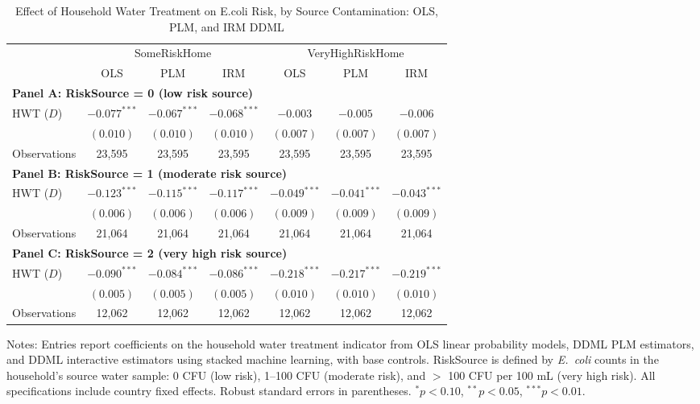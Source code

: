

\begin{table}[htbp]\centering
\caption{Effect of Household Water Treatment on E.coli Risk, by Source Contamination: OLS, PLM, and IRM DDML}
\label{tab:risk_main}
\begin{tabular}{lcccccc}
\toprule \toprule
& \multicolumn{3}{c}{SomeRiskHome} & \multicolumn{3}{c}{VeryHighRiskHome} \\
\cmidrule(lr){2-4} \cmidrule(lr){5-7}
& OLS & PLM & IRM & OLS & PLM & IRM \\
\midrule
\multicolumn{7}{l}{\textbf{Panel A: RiskSource = 0 (low risk source)}} \\
\midrule
HWT ($D$) &
$-0.077^{***}$ & $-0.067^{***}$ & $-0.068^{***}$ &
$-0.003$ & $-0.005$ & $-0.006$ \\
& $(0.010)$ & $(0.010)$ & $(0.010)$ & $(0.007)$ & $(0.007)$ & $(0.007)$ \\
Observations &
23{,}595 & 23{,}595 & 23{,}595 & 23{,}595 & 23{,}595 & 23{,}595 \\
\midrule
\multicolumn{7}{l}{\textbf{Panel B: RiskSource = 1 (moderate risk source)}} \\
\midrule
HWT ($D$) &
$-0.123^{***}$ & $-0.115^{***}$ & $-0.117^{***}$ &
$-0.049^{***}$ & $-0.041^{***}$ & $-0.043^{***}$ \\
& $(0.006)$ & $(0.006)$ & $(0.006)$ & $(0.009)$ & $(0.009)$ & $(0.009)$ \\
Observations &
21{,}064 & 21{,}064 & 21{,}064 & 21{,}064 & 21{,}064 & 21{,}064 \\
\midrule
\multicolumn{7}{l}{\textbf{Panel C: RiskSource = 2 (very high risk source)}} \\
\midrule
HWT ($D$) &
$-0.090^{***}$ & $-0.084^{***}$ & $-0.086^{***}$ &
$-0.218^{***}$ & $-0.217^{***}$ & $-0.219^{***}$ \\
& $(0.005)$ & $(0.005)$ & $(0.005)$ & $(0.010)$ & $(0.010)$ & $(0.010)$ \\
Observations &
12{,}062 & 12{,}062 & 12{,}062 & 12{,}062 & 12{,}062 & 12{,}062 \\
\bottomrule \bottomrule
\end{tabular}
\begin{flushleft}
\footnotesize
Notes: Entries report coefficients on the household water treatment indicator from OLS linear probability models, DDML PLM estimators, and DDML interactive estimators using stacked machine learning, with base controls. RiskSource is defined by \emph{E.~coli} counts in the household's source water sample: 0 CFU (low risk), 1--100 CFU (moderate risk), and $>$ 100 CFU per 100 mL (very high risk). All specifications include country fixed effects. Robust standard errors in parentheses. $^{*} p<0.10$, $^{**} p<0.05$, $^{***} p<0.01$.
\end{flushleft}
\end{table}
